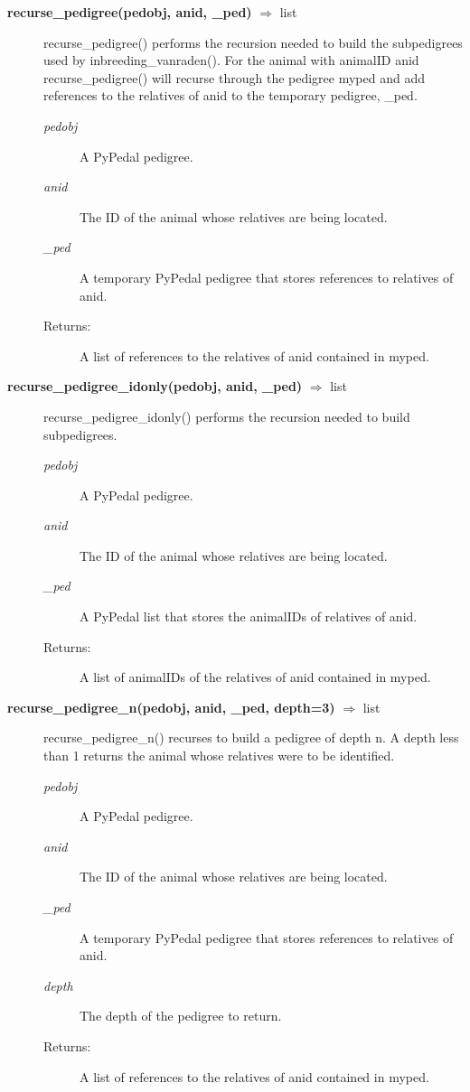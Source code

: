 \begin{description}
\item[\textbf{recurse\_pedigree(pedobj, anid, \_ped)} $\Rightarrow$ list] 
recurse\_pedigree() performs the recursion needed to build the subpedigrees used by inbreeding\_vanraden(). For the animal with animalID anid recurse\_pedigree() will recurse through the pedigree myped and add references to the relatives of anid to the temporary pedigree, \_ped.
\begin{description}
\item[\emph{pedobj}] A PyPedal pedigree.
\item[\emph{anid}] The ID of the animal whose relatives are being located.
\item[\emph{\_ped}] A temporary PyPedal pedigree that stores references to relatives of anid.
\item[Returns:] A list of references to the relatives of anid contained in myped.
\end{description}

\item[\textbf{recurse\_pedigree\_idonly(pedobj, anid, \_ped)} $\Rightarrow$ list] 
recurse\_pedigree\_idonly() performs the recursion needed to build subpedigrees.
\begin{description}
\item[\emph{pedobj}] A PyPedal pedigree.
\item[\emph{anid}] The ID of the animal whose relatives are being located.
\item[\emph{\_ped}] A PyPedal list that stores the animalIDs of relatives of anid.
\item[Returns:] A list of animalIDs of the relatives of anid contained in myped.
\end{description}

\item[\textbf{recurse\_pedigree\_n(pedobj, anid, \_ped, depth=3)} $\Rightarrow$ list] 
recurse\_pedigree\_n() recurses to build a pedigree of depth n. A depth less than 1 returns the animal whose relatives were to be identified.
\begin{description}
\item[\emph{pedobj}] A PyPedal pedigree.
\item[\emph{anid}] The ID of the animal whose relatives are being located.
\item[\emph{\_ped}] A temporary PyPedal pedigree that stores references to relatives of anid.
\item[\emph{depth}] The depth of the pedigree to return.
\item[Returns:] A list of references to the relatives of anid contained in myped.
\end{description}


\end{description}
